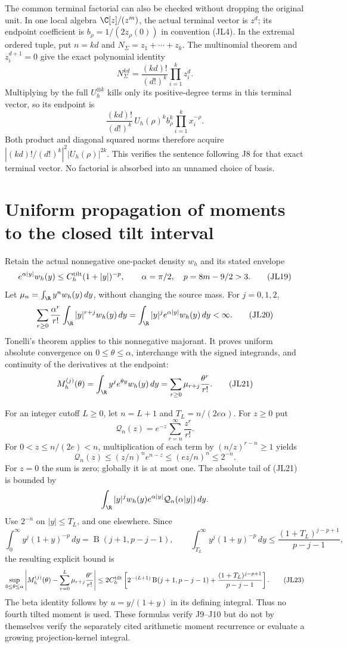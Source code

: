 The common terminal factorial can also be checked without dropping the
original unit.  In one local algebra \(\C[z]/(z^m)\), the actual terminal
vector is \(z^d\); its endpoint coefficient is
\(b_\rho=1/(2z_\rho(0))\) in convention (JL4).
In the extremal ordered tuple, put \(n=kd\) and
\(N_\Sigma=z_1+\cdots+z_k\).  The multinomial theorem and \(z_i^{d+1}=0\)
give the exact polynomial identity
\[
N_\Sigma^{kd}=\frac{(kd)!}{(d!)^k}\prod_{i=1}^k z_i^d.
\tag{JL17}
\]
Multiplying by the full \(U_h^{\otimes k}\) kills only its positive-degree
terms in this terminal vector, so its endpoint is
\[
\frac{(kd)!}{(d!)^k}\,U_h(\rho)^k b_\rho^k
\prod_{i=1}^k x_i^{-\rho}.
\tag{JL18}
\]
Both product and diagonal squared norms therefore acquire
\(\left|(kd)!/(d!)^k\right|^2|U_h(\rho)|^{2k}\).
This verifies the sentence following J8 for that exact terminal vector.
No factorial is absorbed into an unnamed choice of basis.

\section{Uniform propagation of moments to the closed tilt interval}

Retain the actual nonnegative one-packet density \(w_h\) and its stated
envelope
\[
e^{\alpha|y|}w_h(y)\le C_h^{\rm tilt}(1+|y|)^{-p},
\qquad \alpha=\pi/2,\quad p=8m-9/2>3.
\tag{JL19}
\]
Let \(\mu_n=\int_\R y^nw_h(y)\,dy\), without changing the source mass.
For \(j=0,1,2\),
\[
\sum_{r\ge0}\frac{\alpha^r}{r!}
\int_\R |y|^{r+j}w_h(y)\,dy
=\int_\R |y|^je^{\alpha|y|}w_h(y)\,dy<\infty.
\tag{JL20}
\]
Tonelli's theorem applies to this nonnegative majorant.  It proves
uniform absolute convergence on \(0\le\theta\le\alpha\), interchange
with the signed integrands, and continuity of the derivatives at
the endpoint:
\[
M_h^{(j)}(\theta)
=\int_\R y^je^{\theta y}w_h(y)\,dy
=\sum_{r\ge0}\mu_{r+j}\frac{\theta^r}{r!}.
\tag{JL21}
\]

For an integer cutoff \(L\ge0\), let \(n=L+1\) and
\(T_L=n/(2e\alpha)\).  For \(z\ge0\) put
\[
\mathcal Q_n(z)=e^{-z}\sum_{r=n}^{\infty}\frac{z^r}{r!}.
\]
For \(0<z\le n/(2e)<n\), multiplication of each term by
\((n/z)^{r-n}\ge1\) yields
\[
\mathcal Q_n(z)
\le (z/n)^n e^{n-z}
\le(ez/n)^n\le2^{-n}.
\tag{JL22}
\]
For \(z=0\) the sum is zero; globally it is at most one.
The absolute tail of (JL21) is bounded by
\[
\int_\R |y|^jw_h(y)e^{\alpha|y|}
\mathcal Q_n(\alpha|y|)\,dy.
\]
Use \(2^{-n}\) on \(|y|\le T_L\), and one elsewhere.
Since
\[
\int_0^\infty y^j(1+y)^{-p}\,dy
=\operatorname B(j+1,p-j-1),\qquad
\int_{T_L}^\infty y^j(1+y)^{-p}\,dy
\le\frac{(1+T_L)^{j-p+1}}{p-j-1},
\]
the resulting explicit bound is
\[
\sup_{0\le\theta\le\alpha}
\left|M_h^{(j)}(\theta)
-\sum_{r=0}^{L}\mu_{r+j}\frac{\theta^r}{r!}\right|
\le2C_h^{\rm tilt}\left[
2^{-(L+1)}\operatorname B(j+1,p-j-1)
+\frac{(1+T_L)^{j-p+1}}{p-j-1}\right].
\tag{JL23}
\]
The beta identity follows by \(u=y/(1+y)\) in its defining integral.
Thus no fourth tilted moment is used.  These formulas verify J9--J10
but do not by themselves verify the separately cited arithmetic
moment recurrence or evaluate a growing projection-kernel integral.


